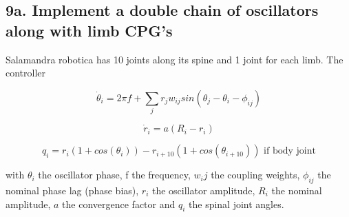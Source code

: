 \documentclass{cmc}
\begin{document}
\subsection*{9a. Implement a double chain of oscillators along with
  limb CPG's}
\label{sec:implement-chain}

Salamandra robotica has 10 joints along its spine and 1 joint for each
limb. The controller

\begin{equation}
  \label{eq:dphase}
  \dot{\theta}_i = 2 \pi f + \sum_j r_j w_{ij} sin(\theta_j - \theta_i - \phi_{ij})
\end{equation}

\begin{equation}
  \label{eq:dr}
  \dot{r}_i = a (R_i - r_i)
\end{equation}

\begin{equation}
  \label{eq:output}
  {q}_i = r_i(1 + cos(\theta_i)) - r_{i+10}(1 + cos(\theta_{i+10})) \text{ if body joint}
\end{equation}

with $ \theta_i $ the oscillator phase, f the frequency, $ w{_ij} $ the coupling
weights, $ \phi_{ij} $ the nominal phase lag (phase bias), $ r_i $ the
oscillator amplitude, $ R_i $ the nominal amplitude, $ a $ the convergence
factor and $ q_i $ the spinal joint angles.
\end{document}
